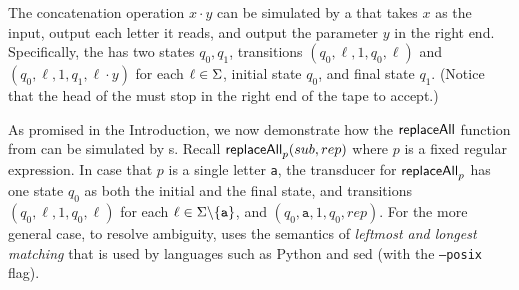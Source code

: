 \begin{example} \label{example:2pt}
 The concatenation operation $x \cdot y$ can be simulated by a \PT{} that takes $x$ as the input, output each letter it reads, and output the parameter $y$ in the right end. Specifically, the \PT{} has two states $q_0, q_1$, transitions $(q_0, \ell, 1, q_0, \ell)$ and $(q_0, \ell, 1, q_1, \ell \cdot y)$ for each $\ell \in \Sigma$,  initial state $q_0$, and final state $q_1$. (Notice that the head of the \PT{} must stop in the right end of the tape to accept.) 
 
  As promised in the Introduction, we now demonstrate how the  $\mathsf{replaceAll}$ function from \cite{CCHLW18} can be simulated by \PT{}s.
%
 Recall $\mathsf{replaceAll}_{p}(sub, rep)$ where $p$ is a fixed regular expression. %
    In case that $p$ is  a single letter \texttt{a}, the transducer for $\mathsf{replaceAll}_{p}$ has one state $q_0$ as both the initial and the final state,
    and transitions 
    $(q_0,\ell, 1, q_0, \ell)$ for each $\ell \in \Sigma \backslash
    \{\texttt{a}\}$, 
    and $(q_0, \texttt{a}, 1, q_0, rep)$. For the more general case, to resolve ambiguity, \cite{CCHLW18} uses the semantics of \emph{leftmost and longest matching} that is used by languages such as Python and sed (with the  \texttt{--posix} flag).

\end{example}
